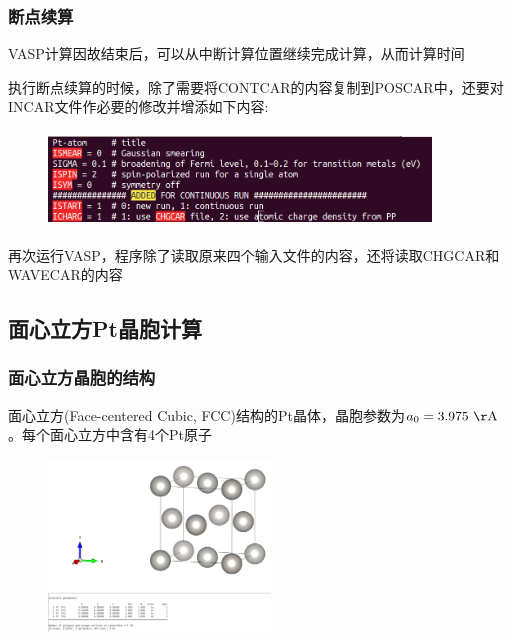 \frame
{
	\frametitle{断点续算}
\textrm{VASP}计算因故结束后，可以从中断计算位置继续完成计算，从而计算时间

执行断点续算的时候，除了需要将\textrm{CONTCAR}的内容复制到\textrm{POSCAR}中，还要对\textrm{INCAR}文件作必要的修改并增添如下内容:
\begin{figure}[h!]
\centering
\vskip -5pt
\includegraphics[height=1.0in,width=4.0in,viewport=0 0 700 157,clip]{Figures/Pt_atom-continurun.png}
\caption{\fontsize{6.2pt}{5.2pt}}%
\label{Pt_atom:continuruntime}
\end{figure}
再次运行\textrm{VASP}，程序除了读取原来四个输入文件的内容，还将读取\textrm{CHGCAR}和\textrm{WAVECAR}的内容%
}
\subsection{面心立方{\rm Pt}晶胞计算}\label{Sec:FCC-Pt}
\frame
{
	\frametitle{面心立方晶胞的结构}
	面心立方\textrm{(Face-centered Cubic, FCC)}结构的\textrm{Pt}晶体，晶胞参数为$a_0=3.975~\mathrm{\AA}$。每个面心立方中含有4个\textrm{Pt}原子
\begin{figure}[h!]
\centering
\includegraphics[height=1.8in,viewport=350 210 840 640,clip]{Figures/VASP_train-FCC.png}
\caption{\fontsize{6.2pt}{5.2pt}}%
\label{Pt_FCC:structure}
\end{figure}
}

